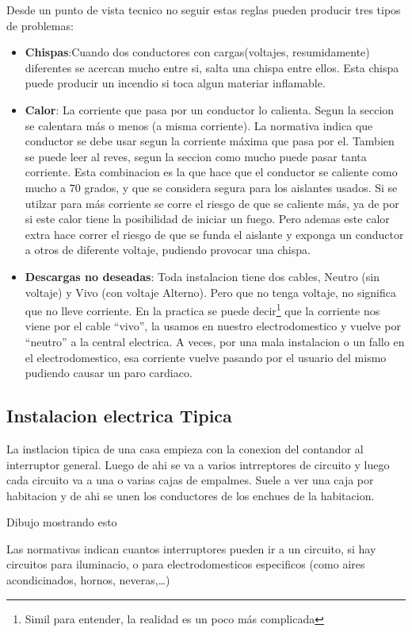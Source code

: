 Desde un punto de vista tecnico no seguir estas reglas pueden producir tres tipos de problemas:
\begin{itemize}
	\item \textbf{Chispas}:Cuando dos conductores con cargas(voltajes, resumidamente) diferentes se acercan mucho entre si, salta una chispa entre ellos. Esta chispa puede producir un incendio si toca algun materiar inflamable.
	\item \textbf{Calor}: La corriente que pasa por un conductor lo calienta. Segun la seccion se calentara más o menos (a misma corriente). La normativa indica que conductor se debe usar segun la corriente máxima que pasa por el. Tambien se puede leer al reves, segun la seccion como mucho puede pasar tanta corriente. Esta combinacion es la que hace que el conductor se caliente como mucho a 70 grados, y que se considera segura para los aislantes usados. Si se utilzar para más corriente se corre el riesgo de que se caliente más, ya de por si este calor tiene la posibilidad de iniciar un fuego. Pero ademas este calor extra hace correr el riesgo de que se funda el aislante y exponga un conductor a otros de diferente voltaje, pudiendo provocar una chispa.
	\item \textbf{Descargas no deseadas}: Toda instalacion tiene dos cables, Neutro (sin voltaje) y Vivo (con voltaje Alterno). Pero que no tenga voltaje, no significa que no lleve corriente. En la practica se puede decir\footnote{Simil para entender, la realidad es un poco más complicada} que la corriente nos viene por el cable ``vivo'', la usamos en nuestro electrodomestico y vuelve por ``neutro'' a la central electrica. A veces, por una mala instalacion o un fallo en el electrodomestico, esa corriente vuelve pasando por el usuario del mismo pudiendo causar un paro cardiaco.
\end{itemize}
\subsection{Instalacion electrica Tipica}
La instlacion tipica de una casa empieza con la conexion del contandor al interruptor general. Luego de ahi se va a varios intrreptores de circuito y luego cada circuito va a una o varias cajas de empalmes. Suele a ver una caja por habitacion y de ahi se unen los conductores de los enchues de la habitacion. 

Dibujo mostrando esto

Las normativas indican cuantos interruptores pueden ir a un circuito, si hay circuitos para iluminacio, o para electrodomesticos especificos (como aires acondicinados, hornos, neveras,\dots)

